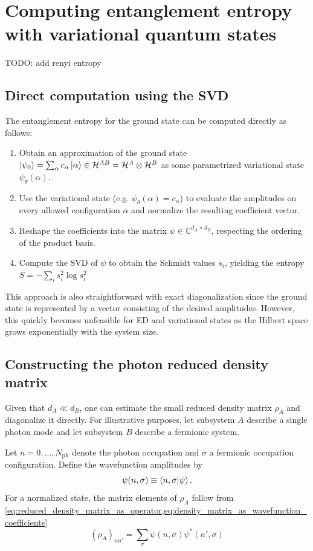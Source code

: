 \documentclass[../../main.tex]{subfiles}
\begin{document}
\section{Computing entanglement entropy with variational quantum states}
\label{sec:entanglement-entropy-vmc}

TODO: add renyi entropy
\subsection{Direct computation using the SVD}

The entanglement entropy for the ground state can be computed directly as follows:
\begin{enumerate}
\item Obtain an approximation of the ground state
      $\left\lvert \psi_0 \right\rangle=\sum_\alpha c_\alpha\left\lvert \alpha \right\rangle\in\mathcal H^{AB} = \mathcal H^{A} \otimes \mathcal H^{B} $ as some parametrized variational state $\psi_\theta(\alpha)$.
\item Use the variational state (e.g. $\psi_\theta(\alpha) = c_\alpha$) to evaluate the amplitudes on every allowed configuration $\alpha$ and normalize the resulting coefficient vector.
\item Reshape the coefficients into the matrix
      $\psi\in\mathbb C^{d_A\times d_B}$, respecting the ordering of the
      product basis.
\item Compute the SVD of $\psi$ to obtain the Schmidt values $s_i$, yielding the entropy $S=-\sum_i s_i^2\log s_i^2$
\end{enumerate}
This approach is also straightforward with exact diagonalization since the ground state is represented by a vector consisting of the desired amplitudes. However, this quickly becomes unfeasible for ED and variational states as the Hilbert space grows exponentially with the system size.


\subsection{Constructing the photon reduced density matrix}

Given that $d_A\ll d_B$, one can estimate the small reduced density matrix $\rho_A$ and diagonalize it directly. For illustrative purposes, let subsystem $A$ describe a single photon mode and let subsystem $B$ describe a fermionic system.

Let $n=0,\dots,N_{\mathrm{ph}}$ denote the photon occupation and $\sigma$
a fermionic occupation configuration. Define the wavefunction amplitudes by
\begin{equation}
\psi(n,\sigma)\equiv\left\langle n,\sigma \middle| \psi \right\rangle.
\end{equation}
For a normalized state, the matrix elements of $\rho_A$ follow from \cref{eq:reduced_density_matrix_as_operator,eq:density_matrix_as_wavefunction_coefficients}
\begin{equation}
(\rho_A)_{nn'}
=\sum_\sigma\psi(n,\sigma)\psi^*(n',\sigma)
\end{equation}
\end{document}
